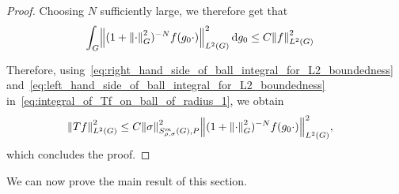 \begin{proof}
    Choosing $N$ sufficiently large,
    we therefore get that
    \begin{align}
        \int_\Group &\norm [\Lebesgue 2 \Group] {(1 + \norm [\Group] \dummy^2)^{-N} f(g_0 \dummy)}^2 \dd g_0
        \leq C \norm [\Lebesgue 2 \Group] f^2
        \label{eq:right_hand_side_of_ball_integral_for_L2_boundedness}
    \end{align}

    Therefore,
    using~\eqref{eq:right_hand_side_of_ball_integral_for_L2_boundedness}
    and~\eqref{eq:left_hand_side_of_ball_integral_for_L2_boundedness}
    in~\eqref{eq:integral_of_Tf_on_ball_of_radius_1},
    we obtain
    \begin{align*}
        \norm [\Lebesgue 2 \Group] {T f}^2
        &\leq C \SymbolSemiNorm m {\rho, \sigma} P \sigma^2
        \norm [\Lebesgue 2 \Group] {(1 + \norm [\Group] \dummy^2)^{-N} f(g_0 \dummy)}^2,
    \end{align*}
    which concludes the proof.
\end{proof}

We can now prove the main result of this section.

